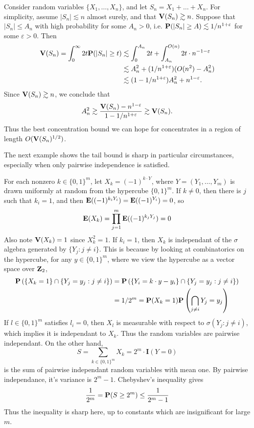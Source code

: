 \begin{example}
    Consider random variables $\{ X_1, \dots, X_n \}$, and let $S_n = X_1 + \dots + X_n$. For simplicity, assume $|S_n| \lesssim n$ almost surely, and that $\operatorname{\mathbf{V}}(S_n) \gtrsim n$. Suppose that $|S_n| \leq A_n$ with high probability for some $A_n > 0$, i.e. $\operatorname{\mathbf{P}}(|S_n| \geq A) \lesssim 1/n^{1 + \varepsilon}$ for some $\varepsilon > 0$. Then
    \begin{align*}
        \operatorname{\mathbf{V}}(S_n) = \int_0^\infty 2t \mathbf{P}(|S_n| \geq t) &\lesssim \int_0^{A_n} 2t + \int_{A_n}^{O(n)} 2t \cdot n^{-1-\varepsilon} \\
        &\lesssim A_n^2 + (1/n^{1 + \varepsilon}) (O(n^2) - A_n^2)\\
        &\lesssim (1 - 1/n^{1 + \varepsilon}) A_n^2 + n^{1-\varepsilon}.
    \end{align*}
    Since $\operatorname{\mathbf{V}}(S_n) \gtrsim n$, we conclude that
    \[ A_n^2 \gtrsim \frac{\operatorname{\mathbf{V}}(S_n) - n^{1 - \varepsilon}}{1 - 1/n^{1 + \varepsilon}} \gtrsim \operatorname{\mathbf{V}}(S_n). \]
    Thus the best concentration bound we can hope for concentrates in a region of length $O(\operatorname{\mathbf{V}}(S_n)^{1/2})$.
\end{example}

The next example shows the tail bound is sharp in particular circumstances, especially when only pairwise independence is satisfied.

\begin{example}
    For each nonzero $k \in \{0,1\}^m$, let $X_k = (-1)^{k \cdot Y}$, where $Y = (Y_1, \dots, Y_m)$ is drawn uniformly at random from the hypercube $\{0,1\}^m$. If $k \neq 0$, then there is $j$ such that $k_i = 1$, and then $\operatorname{\mathbf{E}}((-1)^{k_i Y_i}) = \operatorname{\mathbf{E}}((-1)^{Y_i}) = 0$, so
    \[ \operatorname{\mathbf{E}}(X_k) = \prod_{j = 1}^m \operatorname{\mathbf{E}}((-1)^{k_j Y_j}) = 0 \]
    Also note $\operatorname{\mathbf{V}}(X_k) = 1$ since $X_k^2 = 1$. If $k_i = 1$, then $X_k$ is independant of the $\sigma$ algebra generated by $\{ Y_j : j \neq i \}$. This is because by looking at combinatorics on the hypercube, for any $y \in \{ 0, 1 \}^m$, where we view the hypercube as a vector space over $\operatorname{\mathbf{Z}}_2$,
    \begin{align*}
        \mathbf{P} \left( \{ X_k = 1 \} \cap \{ Y_j = y_j : j \neq i \} \right) &= \mathbf{P} \left( \{ Y_i = k \cdot y - y_i \} \cap \{ Y_j = y_j : j \neq i \} \right)\\
        &= 1/2^m = \mathbf{P}(X_k = 1) \mathbf{P} \left( \bigcap_{j \neq i} Y_j = y_j \right)
    \end{align*}
    If $l \in \{ 0, 1 \}^m$ satisfies $l_i = 0$, then $X_l$ is measurable with respect to $\sigma(Y_j: j \neq i)$, which implies it is independant to $X_k$. Thus the random variables are pairwise independant. On the other hand,
    \[ S = \sum_{k \in \{0,1\}^m} X_k = 2^m \cdot \mathbf{I}(Y = 0) \]
    is the sum of pairwise independant random variables with mean one. By pairwise independance, it's variance is $2^m - 1$. Chebyshev's inequality gives
    \[ \frac{1}{2^m} = \mathbf{P}(S \geq 2^m) \leq \frac{1}{2^m - 1} \]
    Thus the inequality is sharp here, up to constants which are insignificant for large $m$.
\end{example}

